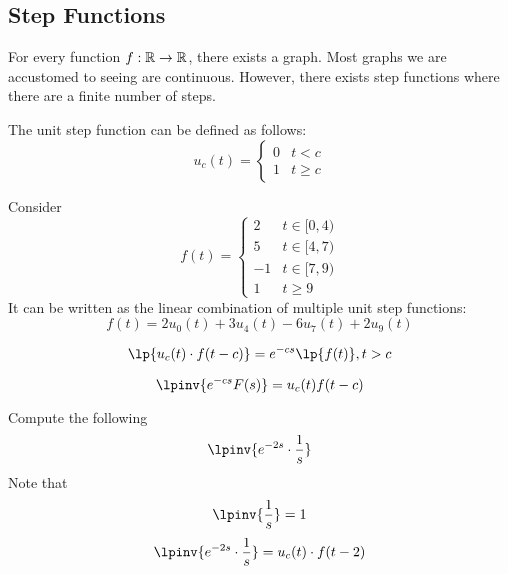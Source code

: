 \documentclass[twoside]{report}
\begin{document}
    \subsection{Step Functions} %
    For every function $f: \mathbb{R} \to \mathbb{R}$, there exists a graph. Most graphs we are accustomed to seeing are continuous. However, there exists step functions where there are a finite number of steps.
    \np
    \begin{definition}
        The unit step function can be defined as follows:
        \begin{equation}
            u_{c}(t) = \begin{cases}
                0 & t < c\\
                1 & t \geq c
            \end{cases}
        \end{equation}
    \end{definition}
    \begin{example}
        Consider
        \begin{equation}
            f(t) = \begin{cases}
                2 & t \in [0, 4) \\
                5 & t \in [4, 7) \\
                -1 & t \in [7, 9) \\
                1 & t \geq 9
            \end{cases}
        \end{equation}
        It can be written as the linear combination of multiple unit step functions:
        \begin{equation}
            f(t) = 2u_{0}(t) + 3u_{4}(t) - 6u_{7}(t) + 2u_{9}(t)
        \end{equation}
    \end{example}
    \begin{btheorem}
        \begin{equation}
            \lp{u_{c}(t)\cdot f(t-c)} = e^{-cs}\lp{f(t)}, t > c
        \end{equation}
    \end{btheorem}
    \begin{corollary}
        \begin{equation}
            \lpinv{e^{-cs}F(s)} = u_{c}(t)f(t-c)
        \end{equation}
    \end{corollary}
    \begin{example}
        Compute the following
        \begin{equation}
            \lpinv{e^{-2s}\cdot \frac{1}{s}}
        \end{equation}
        Note that
        \begin{equation}
            \lpinv{\frac{1}{s}} = 1
        \end{equation}
        \begin{equation}
            \lpinv{e^{-2s}\cdot \frac{1}{s}} = u_{c}(t)\cdot f(t-2)
        \end{equation}
    \end{example}
\end{document}

